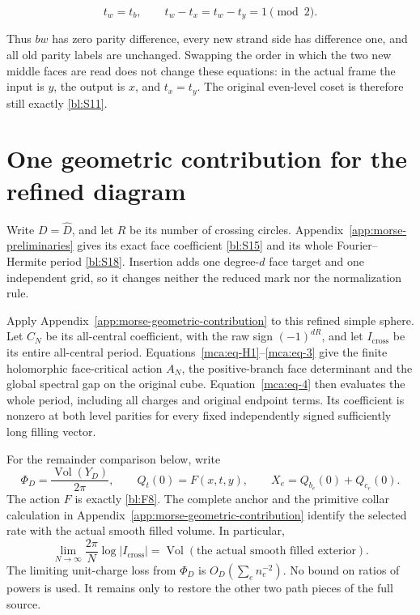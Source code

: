 \begin{equation}\label{bl:S11}
t_w=t_b,\qquad t_w-t_x=t_w-t_y=1\pmod2 .
\end{equation}

Thus \(bw\) has zero parity difference, every new strand side has difference one, and all old parity labels are unchanged. Swapping the order in which the two new middle faces are read does not change these equations: in the actual frame the input is \(y\), the output is \(x\), and \(t_x=t_y\). The original even-level coset is therefore still exactly \eqref{bl:S11}.

\section{One geometric contribution for the refined diagram}
\label{bl:the-calibrated-complete-action-and-all-cross-packet}

Write \(D=\widehat D\), and let \(R\) be its number of crossing
circles. Appendix~\ref{app:morse-preliminaries} gives its exact face
coefficient \eqref{bl:S15} and its whole Fourier--Hermite period
\eqref{bl:S18}. Insertion adds one degree-\(d\) face target and one
independent grid, so it changes neither the reduced mark nor the
normalization rule.

Apply Appendix~\ref{app:morse-geometric-contribution} to this refined
simple sphere. Let \(C_N\) be its all-central coefficient, with the
raw sign \((-1)^{dR}\), and let \(I_{\mathrm{cross}}\) be its entire
all-central period. Equations~\eqref{mca:eq-H1}--\eqref{mca:eq-3}
give the finite holomorphic face-critical action \(A_N\), the
positive-branch face determinant and the global spectral gap on the
original cube. Equation~\eqref{mca:eq-4} then evaluates the whole
period, including all charges and original endpoint terms. Its
coefficient is nonzero at both level parities for every fixed
independently signed sufficiently long filling vector.

For the remainder comparison below, write
\[
 \Phi_D=\frac{\operatorname{Vol}(Y_D)}{2\pi},\qquad
 Q_t(0)=F(x,t,y),\qquad X_e=Q_{b_e}(0)+Q_{c_e}(0).
\]
The action \(F\) is exactly \eqref{bl:F8}. The complete anchor and the
primitive collar calculation in Appendix~\ref{app:morse-geometric-contribution}
identify the selected rate with the actual smooth filled volume.
In particular,
\begin{equation}\label{bl:C19}
 \lim_{N\to\infty}\frac{2\pi}{N}\log|I_{\mathrm{cross}}|
 =\operatorname{Vol}(\text{the actual smooth filled exterior}).
\end{equation}
The limiting unit-charge loss from \(\Phi_D\) is
\(O_D(\sum_e n_e^{-2})\). No bound on ratios of powers is used.
It remains only to restore the other two path pieces of the full source.

